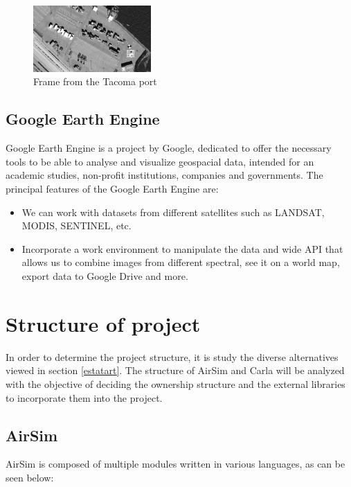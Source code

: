\documentclass[10pt,a4paper,twocolumn,twoside]{article}
\begin{document}
\begin{figure}[!h]
\centering
  	\includegraphics[width=0.4\textwidth]{tacoma}
	\caption{Frame from the Tacoma port}
	\label{fig-tacoma}
\end{figure}

\subsection{Google Earth Engine}

Google Earth Engine is a project by Google, dedicated to offer the necessary tools to be able to analyse and visualize geospacial data, intended for an academic studies, non-profit institutions, companies and governments. The principal features of the Google Earth Engine are:

\begin{itemize}
  \item We can work with datasets from different satellites such as LANDSAT, MODIS, SENTINEL, etc.
  \item Incorporate a work environment to manipulate the data and wide API that allows us to combine images from different spectral, see it on a world map, export data to Google Drive and more.
\end{itemize}

\section{Structure of project}
In order to determine the project structure, it is study the diverse alternatives viewed in section \ref{estatart}. The structure of AirSim and Carla will be analyzed with the objective of deciding the ownership structure and the external libraries to incorporate them into the project.

\subsection{AirSim} 
AirSim is composed of multiple modules written in various languages, as can be seen below:
\end{document}
